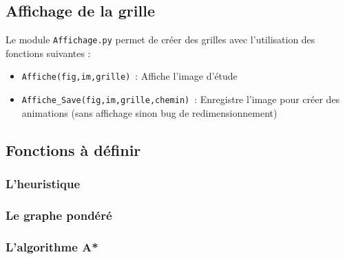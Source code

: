 \subsection{Affichage de la grille}

Le module \texttt{Affichage.py}  permet de créer des grilles avec l'utilisation des fonctions  suivantes :
\begin{itemize}
\item \texttt{Affiche(fig,im,grille)}~: Affiche l'image d'étude
\item \texttt{Affiche\_Save(fig,im,grille,chemin)}~: Enregistre l'image pour créer des
animations (sans affichage sinon bug de redimensionnement)
\end{itemize}




\newpage
\subsection{Fonctions à définir}
\subsubsection{L'heuristique}

\vspace{10cm}



\subsubsection{Le graphe pondéré}

\vspace{10cm}



\subsubsection{L'algorithme A*}




